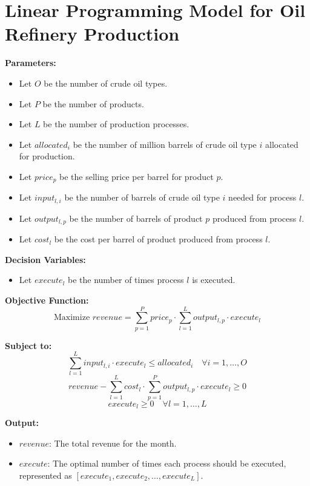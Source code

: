 \documentclass{article}
\begin{document}
\section*{Linear Programming Model for Oil Refinery Production}

\textbf{Parameters:}
\begin{itemize}
    \item Let $O$ be the number of crude oil types.
    \item Let $P$ be the number of products.
    \item Let $L$ be the number of production processes.
    \item Let $allocated_i$ be the number of million barrels of crude oil type $i$ allocated for production.
    \item Let $price_p$ be the selling price per barrel for product $p$.
    \item Let $input_{l,i}$ be the number of barrels of crude oil type $i$ needed for process $l$.
    \item Let $output_{l,p}$ be the number of barrels of product $p$ produced from process $l$.
    \item Let $cost_l$ be the cost per barrel of product produced from process $l$.
\end{itemize}

\textbf{Decision Variables:}
\begin{itemize}
    \item Let $execute_l$ be the number of times process $l$ is executed.
\end{itemize}

\textbf{Objective Function:}
\begin{equation}
    \text{Maximize } revenue = \sum_{p=1}^{P} price_p \cdot \sum_{l=1}^{L} output_{l,p} \cdot execute_l
\end{equation}

\textbf{Subject to:}
\begin{equation}
    \sum_{l=1}^{L} input_{l,i} \cdot execute_l \leq allocated_i \quad \forall i = 1, \ldots, O
\end{equation}
\begin{equation}
    revenue - \sum_{l=1}^{L} cost_l \cdot \sum_{p=1}^{P} output_{l,p} \cdot execute_l \geq 0
\end{equation}
\begin{equation}
    execute_l \geq 0 \quad \forall l = 1, \ldots, L
\end{equation}

\textbf{Output:}
\begin{itemize}
    \item $revenue$: The total revenue for the month.
    \item $execute$: The optimal number of times each process should be executed, represented as $[execute_1, execute_2, \ldots, execute_L]$.
\end{itemize}
\end{document}
